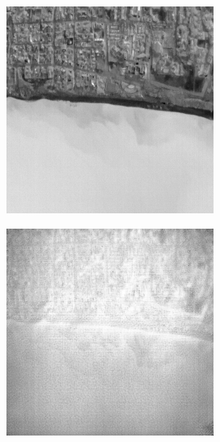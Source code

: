 \begin{figure}[H]
    \begin{subfigure}[b]{0.24\textwidth}
        \centering
        \includegraphics[width=\textwidth]{../figs/outputs/pan/28.png}
        \label{fig:pan}
    \end{subfigure}
    \hfill
    \begin{subfigure}[b]{0.24\textwidth}
        \centering
        \includegraphics[width=\textwidth]{../figs/outputs/cut/28.png}

\end{subfigure}
\end{figure}

